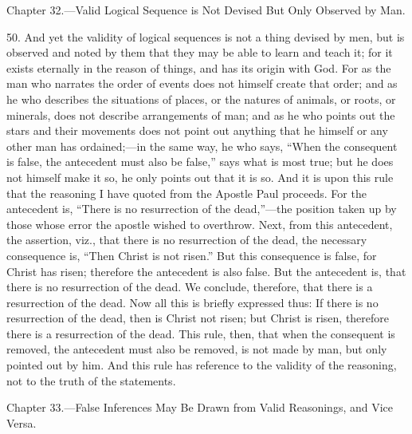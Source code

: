 
Chapter 32.—Valid Logical Sequence is Not Devised But Only Observed by Man.

50. And yet the validity of logical sequences is not a thing devised by men, but is observed and noted by them that they may be able to learn and teach it; for it exists eternally in the reason of things, and has its origin with God. For as the man who narrates the order of events does not himself create that order; and as he who describes the situations of places, or the natures of animals, or roots, or minerals, does not describe arrangements of man; and as he who points out the stars and their movements does not point out anything that he himself or any other man has ordained;—in the same way, he who says, “When the consequent is false, the antecedent must also be false,” says what is most true; but he does not himself make it so, he only points out that it is so. And it is upon this rule that the reasoning I have quoted from the Apostle Paul proceeds. For the antecedent is, “There is no resurrection of the dead,”—the position taken up by those whose error the apostle wished to overthrow. Next, from this antecedent, the assertion, viz., that there is no resurrection of the dead, the necessary consequence is, “Then Christ is not risen.” But this consequence is false, for Christ has risen; therefore the antecedent is also false. But the antecedent is, that there is no resurrection of the dead. We conclude, therefore, that there is a resurrection of the dead. Now all this is briefly expressed thus: If there is no resurrection of the dead, then is Christ not risen; but Christ is risen, therefore there is a resurrection of the dead. This rule, then, that when the consequent is removed, the antecedent must also be removed, is not made by man, but only pointed out by him. And this rule has reference to the validity of the reasoning, not to the truth of the statements.


Chapter 33.—False Inferences May Be Drawn from Valid Reasonings, and Vice Versa.

